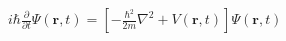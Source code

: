 \documentclass{article}
\begin{document}
\vspace*{\fill}
\begin{center}
\fontsize{60}{72}\selectfont
$\displaystyle i\hbar\frac{\partial}{\partial t}\Psi(\mathbf{r},t) = \left[-\frac{\hbar^2}{2m}\nabla^2 + V(\mathbf{r},t)\right]\Psi(\mathbf{r},t)$
\end{center}
\vspace*{\fill}
\end{document}
